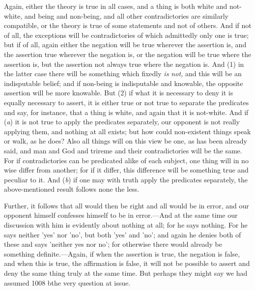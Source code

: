 Again, either the theory is true in all cases, and a thing is both white and not-white, and being and non-being, and all other contradictories are similarly compatible, or the theory is true of some statements and not of others. And if not of all, the exceptions will be contradictories of which admittedly only one is true; but if of all, again either the negation will be true wherever the assertion is, and the assertion true wherever the negation is, or the negation will be true where the assertion is, but the assertion not always true where the negation is. And (1) in the latter case there will be something which fixedly \emph{is not,} and this will be an indisputable belief; and if non-being is indisputable and knowable, the opposite assertion will be more knowable. But (2) if what it is necessary to deny it is equally necessary to assert, it is either true or not true to separate the predicates and say, for instance, that a thing is white, and again that it is not-white. And if (\emph{a}) it is not true to apply the predicates separately, our opponent is not really applying them, and nothing at all exists; but how could non-existent things speak or walk, as he does? Also all things will on this view be one, as has been already said, and man and God and trireme and their contradictories will be the same. For if contradictories can be predicated alike of each subject, one thing will in no wise differ from another; for if it differ, this difference will be something true and peculiar to it. And (\emph{b}) if one may with truth apply the predicates separately, the above-mentioned result follows none the less.

Further, it follows that all would then be right and all would be in error, and our opponent himself confesses himself to be in error.—And at the same time our discussion with him is evidently about nothing at all; for he says nothing. For he says neither 'yes' nor 'no', but both 'yes' and 'no'; and again he denies both of these and says 'neither yes nor no'; for otherwise there would already be something definite.—Again, if when the assertion is true, the negation is false, and when this is true, the affirmation is false, it will not be possible to assert and deny the same thing truly at the same time. But perhaps they might say we had assumed 1008 bthe very question at issue.

